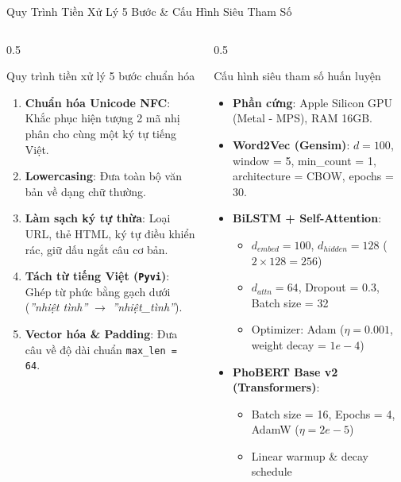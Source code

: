 \documentclass[aspectratio=169, 10pt]{beamer}
\begin{document}
\begin{frame}{Quy Trình Tiền Xử Lý 5 Bước \& Cấu Hình Siêu Tham Số}
  \begin{columns}[c]
    \begin{column}{0.5\textwidth}
      \begin{block}{Quy trình tiền xử lý 5 bước chuẩn hóa}
        \fontsize{7.5}{9.5}\selectfont
        \begin{enumerate}
          \item \textbf{Chuẩn hóa Unicode NFC}: Khắc phục hiện tượng 2 mã nhị phân cho cùng một ký tự tiếng Việt.
          \item \textbf{Lowercasing}: Đưa toàn bộ văn bản về dạng chữ thường.
          \item \textbf{Làm sạch ký tự thừa}: Loại URL, thẻ HTML, ký tự điều khiển rác, giữ dấu ngắt câu cơ bản.
          \item \textbf{Tách từ tiếng Việt (\texttt{Pyvi})}: Ghép từ phức bằng gạch dưới (\textit{''nhiệt tình''} $\to$ \textit{''nhiệt\_tình''}).
          \item \textbf{Vector hóa \& Padding}: Đưa câu về độ dài chuẩn \texttt{max\_len = 64}.
        \end{enumerate}
      \end{block}
    \end{column}

    \begin{column}{0.5\textwidth}
      \begin{block}{Cấu hình siêu tham số huấn luyện}
        \fontsize{7.5}{9.5}\selectfont
        \begin{itemize}
          \item \textbf{Phần cứng}: Apple Silicon GPU (Metal - MPS), RAM 16GB.
          \item \textbf{Word2Vec (Gensim)}: $d = 100$, window = 5, min\_count = 1, architecture = CBOW, epochs = 30.
          \item \textbf{BiLSTM + Self-Attention}:
            \begin{itemize}\fontsize{7}{8.5}\selectfont
              \item $d_{embed} = 100$, $d_{hidden} = 128$ ($2 \times 128 = 256$)
              \item $d_{attn} = 64$, Dropout = 0.3, Batch size = 32
              \item Optimizer: Adam ($\eta = 0.001$, weight decay = $1e-4$)
            \end{itemize}
          \item \textbf{PhoBERT Base v2 (Transformers)}:
            \begin{itemize}\fontsize{7}{8.5}\selectfont
              \item Batch size = 16, Epochs = 4, AdamW ($\eta = 2e-5$)
              \item Linear warmup \& decay schedule
            \end{itemize}
        \end{itemize}
      \end{block}
    \end{column}
  \end{columns}
\end{frame}
\end{document}
